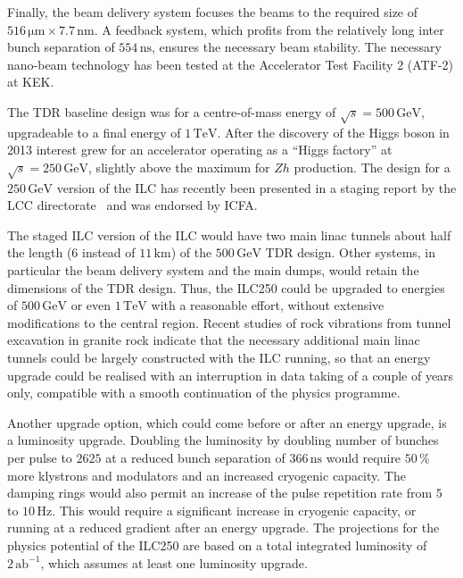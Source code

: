 \documentclass[%
 reprint,
 amsmath,amssymb,
 aps,
]{revtex4-1}
\begin{document}
Finally, the beam delivery system focuses the beams to the required size of $516\,{\mathrm{\mu m}} \times 7.7\,{\mathrm{nm}} $. 
A feedback system, which profits from the relatively long inter bunch separation of $554\,{\mathrm{ns}}$, ensures the necessary beam stability. 
The necessary nano-beam technology has been tested at the Accelerator Test Facility 2 (ATF-2) at KEK.


The TDR baseline design was for a centre-of-mass energy of $\sqrt{s}=500\,{\mathrm{GeV}}$, upgradeable to a final energy of $1\,{\mathrm{TeV}}$.
After the discovery of the Higgs boson in 2013 interest grew for an accelerator operating as a ``Higgs factory'' at $\sqrt{s}=250\,{\mathrm{GeV}}$, slightly above the maximum for $Zh$ production. 
The design for a $250\,{\mathrm{GeV}}$ version of the ILC has recently been presented in a  staging report by the LCC directorate~\cite{Evans:2017rvt} and was endorsed by ICFA.

The staged ILC version of the ILC  
would have two main linac tunnels about half the length ($6$ instead of $11\, {\mathrm{km}}$) of the $500\,{\mathrm{GeV}}$ TDR design. 
Other systems, in particular the beam delivery system and the main dumps, would retain the dimensions of the TDR design.
Thus, the ILC250 could be upgraded to energies of $500\,{\mathrm{GeV}}$ or even $1\,{\mathrm{TeV}}$ with a reasonable effort, without extensive modifications to the central region. 
Recent studies of rock vibrations from tunnel excavation in granite rock indicate that the necessary additional main linac tunnels could be largely constructed with the ILC running, so that an energy upgrade could be realised with an interruption in data taking of a couple of years only, compatible with a smooth continuation of the physics programme.

Another upgrade option, which could come before or after an energy upgrade, is a luminosity upgrade. 
Doubling the luminosity by doubling number of bunches per pulse to $2625$ at a reduced bunch separation of $366\,{\mathrm{ns}}$ would require $50\,\%$ more klystrons and modulators and an increased cryogenic capacity. 
The damping rings would also permit an increase of the pulse repetition rate from $5$ to $10\,{\mathrm{Hz}}$. 
This would require a significant increase in cryogenic capacity, or running at a reduced gradient after an energy upgrade.
The projections for the physics potential of the ILC250 are based on a total integrated luminosity of $2\,{\mathrm{ab}}^{-1}$, which assumes at least one luminosity upgrade.
\end{document}

